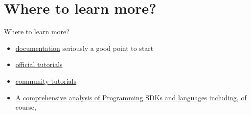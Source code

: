\documentclass[aspectratio=43]{beamer}
\begin{document}
\section{Where to learn more?}
\begin{frame}{Where to learn more?}
\begin{card}
    \begin{itemize}
        \item \href{https://qiskit.org/documentation/aqua/index.html}{\qka documentation} seriously a good point to start
        \item \href{https://github.com/Qiskit/qiskit-tutorial/tree/master/qiskit/aqua}{\qka official tutorials}
        \item \href{https://github.com/Qiskit/qiskit-tutorial/tree/master/community/aqua}{\qka community tutorials}
        \item \href{https://en.wikipedia.org/wiki/Quantum_programming}{A comprehensive analysis of \q Programming SDKs and languages} including, of course, \qk
    \end{itemize}
\end{card}
\end{frame}
\end{document}
